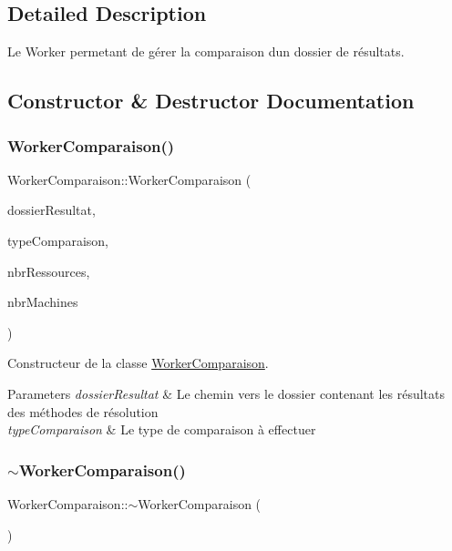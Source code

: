 \subsection{Detailed Description}
Le Worker permetant de gérer la comparaison d\textquotesingle{}un dossier de résultats. 

\subsection{Constructor \& Destructor Documentation}
\mbox{\label{classWorkerComparaison_a145d174d34098a5271b223025f165b09}} 
\subsubsection{\texorpdfstring{Worker\+Comparaison()}{WorkerComparaison()}}
{\footnotesize\ttfamily Worker\+Comparaison\+::\+Worker\+Comparaison (\begin{DoxyParamCaption}\item[{Q\+String}]{dossier\+Resultat,  }\item[{Q\+String}]{type\+Comparaison,  }\item[{int}]{nbr\+Ressources,  }\item[{int}]{nbr\+Machines }\end{DoxyParamCaption})}



Constructeur de la classe \hyperlink{classWorkerComparaison}{Worker\+Comparaison}. 


\begin{DoxyParams}{Parameters}
{\em dossier\+Resultat} & Le chemin vers le dossier contenant les résultats des méthodes de résolution \\
\hline
{\em type\+Comparaison} & Le type de comparaison à effectuer \\
\hline
\end{DoxyParams}
\mbox{\label{classWorkerComparaison_a82acf722e3274431c0f86093c9dcb799}} 
\subsubsection{\texorpdfstring{$\sim$\+Worker\+Comparaison()}{~WorkerComparaison()}}
{\footnotesize\ttfamily Worker\+Comparaison\+::$\sim$\+Worker\+Comparaison (\begin{DoxyParamCaption}{ }\end{DoxyParamCaption})}



